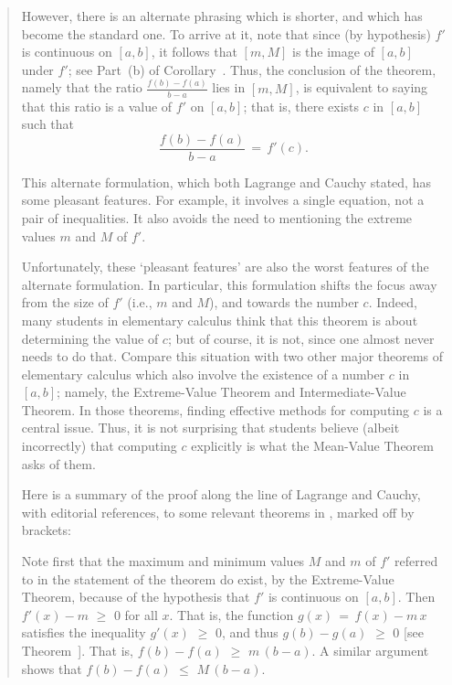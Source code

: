 \begin{quotation}
{        However, there is an alternate phrasing which is shorter, and which has become the standard one.
    To arrive at it, note that since (by hypothesis) $f'$ is continuous on $[a,b]$, it follows that $[m,M]$ is the image of $[a,b]$ under $f'$;
    see Part~(b) of Corollary~.
    Thus, the conclusion of the theorem, namely that the ratio ${\displaystyle \frac{f(b)-f(a)}{b-a}}$ lies in $[m,M]$,
    is equivalent to saying that this ratio is a value of $f'$ on $[a,b]$;
    that is, there exists $c$ in $[a,b]$ such that
        \begin{displaymath}
        \frac{f(b)-f(a)}{b-a} \,=\, f'(c).
        \end{displaymath}

        This alternate formulation, which both Lagrange and Cauchy stated, has some pleasant features.
    For example, it involves a single equation, not a pair of inequalities. It also avoids the need to mentioning the extreme values $m$ and $M$ of $f'$.

        Unfortunately, these `pleasant features' are also the worst features of the alternate formulation.
    In particular, this formulation shifts the focus away from the size of $f'$ (i.e., $m$ and $M$), and towards the number $c$.
    Indeed, many students in elementary calculus think that this theorem is about determining the value of $c$;
    but of course, it is not, since one almost never needs to do that. Compare this situation
    with two other major theorems of elementary calculus which also involve the existence of a number $c$ in $[a,b]$;
    namely, the Extreme-Value Theorem and Intermediate-Value Theorem. In those theorems, finding effective methods for computing $c$ is a central issue.
    Thus, it is not surprising that students believe (albeit incorrectly) that computing $c$ explicitly is what the Mean-Value Theorem asks of them.

        Here is a summary of the proof along the line of Lagrange and Cauchy, with editorial references, to some relevant theorems in {\ThisText}, marked off by brackets:

    Note first that the maximum and minimum values $M$ and $m$ of $f'$ referred to in the statement of the theorem do exist,
    by the Extreme-Value Theorem, because of the hypothesis that $f'$ is continuous on $[a,b]$.
    Then $f'(x)-m\,\,{\geq}\,\,0$ for all $x$. That is, the function $g(x) \,=\, f(x)-m\,x$ satisfies the inequality $g'(x)\,\,{\geq}\,\,0$,
    and thus $g(b)-g(a)\,\,{\geq}\,\,0$ [see Theorem~]. That is, $f(b)-f(a)\,\,{\geq}\,\,m\,(b-a)$.
    A similar argument shows that $f(b)-f(a)\,\,{\leq}\,\,M\,(b-a)$.

}
\end{quotation}
